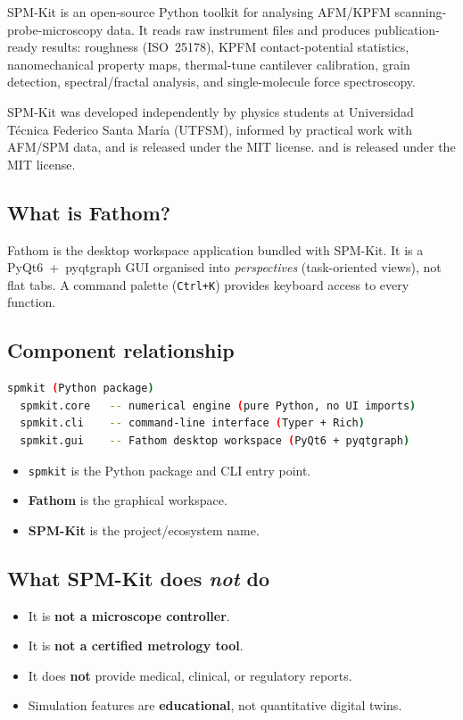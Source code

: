 \documentclass[a4paper,11pt]{article}
\begin{document}
SPM-Kit is an open-source Python toolkit for analysing AFM/KPFM scanning-probe-microscopy data.
It reads raw instrument files and produces publication-ready results: roughness
(ISO~25178), KPFM contact-potential statistics, nanomechanical property maps,
thermal-tune cantilever calibration, grain detection, spectral/fractal analysis, and
single-molecule force spectroscopy.

SPM-Kit was developed independently by physics students at Universidad T\'ecnica Federico Santa Mar\'ia (UTFSM), informed by practical work with AFM/SPM data, and is released under the MIT license.
and is released under the MIT license.

\subsection{What is Fathom?}

Fathom is the desktop workspace application bundled with SPM-Kit. It is a PyQt6~+~pyqtgraph
GUI organised into \emph{perspectives} (task-oriented views), not flat tabs. A command
palette (\texttt{Ctrl+K}) provides keyboard access to every function.

\subsection{Component relationship}

\begin{lstlisting}[language=bash]
spmkit (Python package)
  spmkit.core   -- numerical engine (pure Python, no UI imports)
  spmkit.cli    -- command-line interface (Typer + Rich)
  spmkit.gui    -- Fathom desktop workspace (PyQt6 + pyqtgraph)
\end{lstlisting}

\begin{itemize}
  \item \texttt{spmkit} is the Python package and CLI entry point.
  \item \textbf{Fathom} is the graphical workspace.
  \item \textbf{SPM-Kit} is the project/ecosystem name.
\end{itemize}

\subsection{What SPM-Kit does \emph{not} do}
\begin{itemize}[nosep]
  \item It is \textbf{not a microscope controller}.
  \item It is \textbf{not a certified metrology tool}.
  \item It does \textbf{not} provide medical, clinical, or regulatory reports.
  \item Simulation features are \textbf{educational}, not quantitative digital twins.
\end{itemize}
\end{document}
